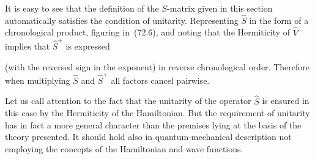 It is easy to see that the definition of the $S$-matrix given in this section automatically satisfies the condition of unitarity. Representing $\hat{S}$ in the form of a chronological product, figuring in~(72.6), and noting that the Hermiticity of $\hat{V}$ implies that $\hat{S}^+$ is expressed

(with the reversed sign in the exponent) in reverse chronological order. Therefore when multiplying $\hat{S}$ and $\hat{S}^+$ all factors cancel pairwise.

Let us call attention to the fact that the unitarity of the operator $\hat{S}$ is ensured in this case by the Hermiticity of the Hamiltonian. But the requirement of unitarity has in fact a more general character than the premises lying at the basis of the theory presented. It should hold also in quantum-mechanical description not employing the concepts of the Hamiltonian and wave functions.
